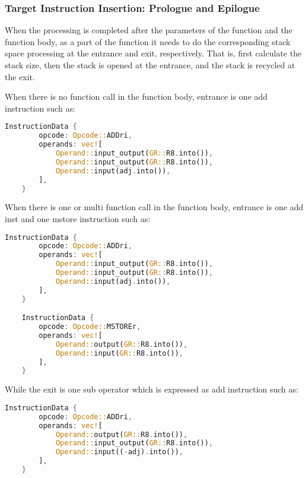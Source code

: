 \subsubsection{Target Instruction Insertion: Prologue and Epilogue}

When the processing is completed after the parameters of the function and the function body, 
as a part of the function it needs to do the corresponding stack space processing at the entrance and exit, respectively.
That is, first calculate the stack size, then the stack is opened at the entrance, and the stack is recycled at the exit.

When there is no function call in the function body, entrance is one add instruction such as:
\begin{lstlisting}[language=rust]
    InstructionData {
        opcode: Opcode::ADDri,
        operands: vec![
            Operand::input_output(GR::R8.into()),
            Operand::input_output(GR::R8.into()),
            Operand::input(adj.into()),
        ],
    }
\end{lstlisting}

When there is one or multi function call in the function body, entrance is one add inst and one mstore instruction such as:
\begin{lstlisting}[language=rust]
    InstructionData {
        opcode: Opcode::ADDri,
        operands: vec![
            Operand::input_output(GR::R8.into()),
            Operand::input_output(GR::R8.into()),
            Operand::input(adj.into()),
        ],
    }

    InstructionData {
        opcode: Opcode::MSTOREr,
        operands: vec![
            Operand::output(GR::R8.into()),
            Operand::input(GR::R8.into()),
        ],
    }
\end{lstlisting}

While the exit is one sub operator which is expressed as add instruction such as:
\begin{lstlisting}[language=rust]
    InstructionData {
        opcode: Opcode::ADDri,
        operands: vec![
            Operand::output(GR::R8.into()),
            Operand::input_output(GR::R8.into()),
            Operand::input((-adj).into()),
        ],
    }
\end{lstlisting}
